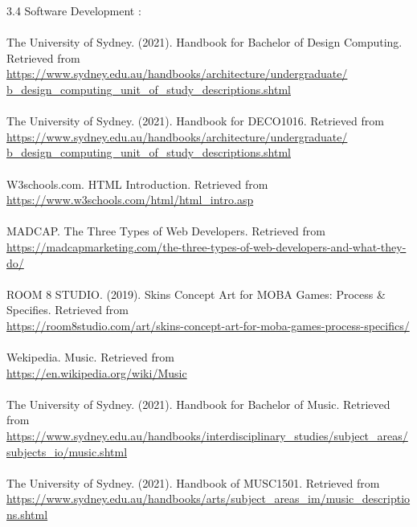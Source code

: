 \documentclass{article}
\begin{document}
	3.4 Software Development :\\
	\\
	The University of Sydney. (2021). Handbook for Bachelor of Design Computing. Retrieved from\\ \url{https://www.sydney.edu.au/handbooks/architecture/undergraduate/
	b_design_computing_unit_of_study_descriptions.shtml}\\
	\\
	The University of Sydney. (2021). Handbook for DECO1016. Retrieved from\\ \url{https://www.sydney.edu.au/handbooks/architecture/undergraduate/
	b_design_computing_unit_of_study_descriptions.shtml}\\
	\\
	W3schools.com. HTML Introduction. Retrieved from\\
    \url{https://www.w3schools.com/html/html_intro.asp}\\
    \\
    MADCAP. The Three Types of Web Developers. Retrieved from\\
    \url{https://madcapmarketing.com/the-three-types-of-web-developers-and-what-they-do/}\\
    \\
    ROOM 8 STUDIO. (2019). Skins Concept Art for MOBA Games: Process & Specifies. Retrieved from\\
    \url{https://room8studio.com/art/skins-concept-art-for-moba-games-process-specifics/}\\
    \\
    Wekipedia. Music. Retrieved from\\
    \url{https://en.wikipedia.org/wiki/Music}\\
    \\
    The University of Sydney. (2021). Handbook for Bachelor of Music. Retrieved from\\
    \url{https://www.sydney.edu.au/handbooks/interdisciplinary_studies/subject_areas/subjects_io/music.shtml}\\
    \\
    The University of Sydney. (2021). Handbook of MUSC1501. Retrieved from\\
    \url{https://www.sydney.edu.au/handbooks/arts/subject_areas_im/music_descriptions.shtml}\\
    \\
    
\end{document}
